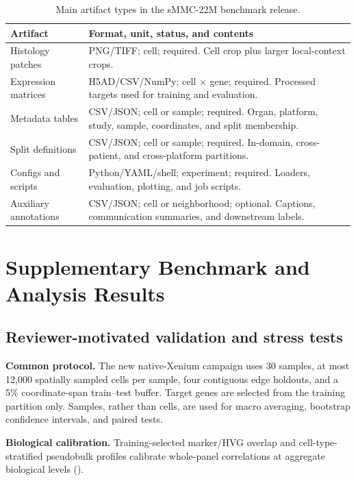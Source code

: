 \documentclass[sigconf,review]{acmart}
\newcommand{\dataset}{sMMC-22M\xspace}
\begin{document}
\begin{table}[H]
\centering
\scriptsize
\setlength{\tabcolsep}{5pt}
\caption{Main artifact types in the \dataset benchmark release.}
\label{tab:data_schema}
\begin{tabularx}{\linewidth}{
>{\raggedright\arraybackslash}p{2.65cm}
>{\raggedright\arraybackslash}X}
\toprule
\textbf{Artifact} & \textbf{Format, unit, status, and contents} \\
\midrule
Histology patches & PNG/TIFF; cell; required. Cell crop plus larger local-context crops. \\
Expression matrices & H5AD/CSV/NumPy; cell \(\times\) gene; required. Processed targets used for training and evaluation. \\
Metadata tables & CSV/JSON; cell or sample; required. Organ, platform, study, sample, coordinates, and split membership. \\
Split definitions & CSV/JSON; cell or sample; required. In-domain, cross-patient, and cross-platform partitions. \\
Configs and scripts & Python/YAML/shell; experiment; required. Loaders, evaluation, plotting, and job scripts. \\
Auxiliary annotations & CSV/JSON; cell or neighborhood; optional. Captions, communication summaries, and downstream labels. \\
\bottomrule
\end{tabularx}
\end{table}

\section{Supplementary Benchmark and Analysis Results}
\label{sec:supplementary_results}
\subsection{Reviewer-motivated validation and stress tests}
\label{sec:reviewer_validation}

\noindent\textbf{Common protocol.}
The new native-Xenium campaign uses 30 samples, at most 12{,}000 spatially
sampled cells per sample, four contiguous edge holdouts, and a 5\%
coordinate-span train--test buffer. Target genes are selected from the training
partition only. Samples, rather than cells, are used for macro averaging,
bootstrap confidence intervals, and paired tests.

\noindent\textbf{Biological calibration.}
Training-selected marker/HVG overlap and cell-type-stratified pseudobulk
profiles calibrate whole-panel correlations at aggregate biological levels
().
\end{document}
